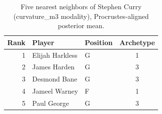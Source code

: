 \begin{table}[htbp]
  \centering\small
  \begin{tabular}{rllc}
    \toprule
    Rank & Player & Position & Archetype \\
    \midrule
    1 & Elijah Harkless & G & 1 \\
    2 & James Harden & G & 3 \\
    3 & Desmond Bane & G & 3 \\
    4 & Jameel Warney & F & 1 \\
    5 & Paul George & G & 3 \\
    \bottomrule
  \end{tabular}
  \caption{Five nearest neighbors of Stephen Curry (curvature_m3 modality), Procrustes-aligned posterior mean.}
  \label{tab:Stephen_Curry_neighbors_curvature_m3}
\end{table}

